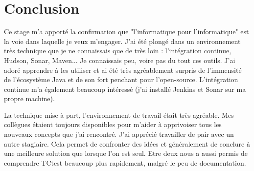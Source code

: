 \section{Conclusion}

Ce stage m'a apporté la confirmation que "l'informatique pour l'informatique" 
est la voie dans laquelle je veux m'engager. J'ai été plongé dans un 
environnement très technique que je ne connaissais que de très loin : 
l'intégration continue, Hudson, Sonar, Maven... Je connaissais peu, 
voire pas du tout ces outils. J'ai adoré apprendre à les utiliser et ai été très 
agréablement surpris de l'immensité de l'écosystème Java et de son fort 
penchant pour l'open-source. L'intégration continue m'a également beaucoup 
intéressé (j'ai installé Jenkins et Sonar sur ma propre machine).

La technique mise à part, l'environnement de travail était très agréable. 
Mes collègues étaient toujours disponibles pour m'aider à apprivoiser tous les 
nouveaux concepts que j'ai rencontré. J'ai apprécié travailler de pair avec un 
autre stagiaire. Cela permet de confronter des idées et généralement de conclure
à une meilleure solution que lorsque l'on est seul. Etre deux nous a aussi 
permis de comprendre TCtest beaucoup plus rapidement, malgré le peu de 
documentation.